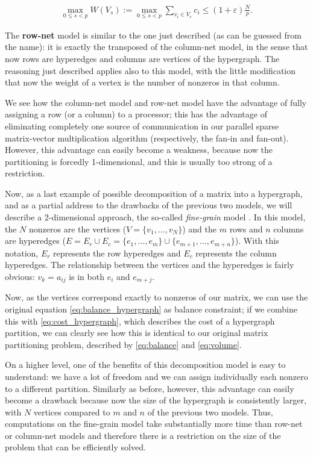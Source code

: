 \begin{align}
	\max_{0 \leq s <p}	W(V_s) := \max_{0 \leq s <p} \sum_{v_i \in V_s} c_i \leq (1 + \varepsilon) \frac{N}{p}.
	\label{eq:balance_columnet}
\end{align}

The \textbf{row-net} model is similar to the one just described (as can be guessed from the name): it is exactly the transposed of the column-net model, in the sense that now rows are hyperedges and columns are vertices of the hypergraph. The reasoning just described applies also to this model, with the little modification that now the weight of a vertex is the number of nonzeros in that column.

We see how the column-net model and row-net model have the advantage of fully assigning a row (or a column) to a processor; this has the advantage of eliminating completely one source of communication in our parallel sparse matrix-vector multiplication algorithm (respectively, the fan-in and fan-out). However, this advantage can easily become a weakness, because now the partitioning is forcedly 1-dimensional, and this is usually too strong of a restriction.

Now, as a last example of possible decomposition of a matrix into a hypergraph, and as a partial address to the drawbacks of the previous two models, we will describe a 2-dimensional approach, the so-called \emph{fine-grain} model \cite{hypergraph_finegrain}. In this model, the $N$ nonzeros are the vertices ($V = \{ v_1,\dots,v_N\}$) and the $m$ rows and $n$ columns are hyperedges ($E = E_r \cup E_c = \{ e_1,\dots,e_m \} \cup \{e_{m+1},\dots,e_{m+n}\}$). With this notation, $E_r$ represents the row hyperedges and $E_c$ represents the column hyperedges. The relationship between the vertices and the hyperedges is fairly obvious: $v_k = a_{ij}$ is in both $e_i$ and $e_{m+j}$.

Now, as the vertices correspond exactly to nonzeros of our matrix, we can use the original equation \eqref{eq:balance_hypergraph} as balance constraint; if we combine this with \eqref{eq:cost_hypergraph}, which describes the cost of a hypergraph partition, we can clearly see how this is identical to our original matrix partitioning problem, described by \eqref{eq:balance} and \eqref{eq:volume}.

On a higher level, one of the benefits of this decomposition model is easy to understand: we have a lot of freedom and we can assign individually each nonzero to a different partition. Similarly as before, however, this advantage can easily become a drawback because now the size of the hypergraph is consistently larger, with $N$ vertices compared to $m$ and $n$ of the previous two models. Thus, computations on the fine-grain model take substantially more time than row-net or column-net models and therefore there is a restriction on the size of the problem that can be efficiently solved.

